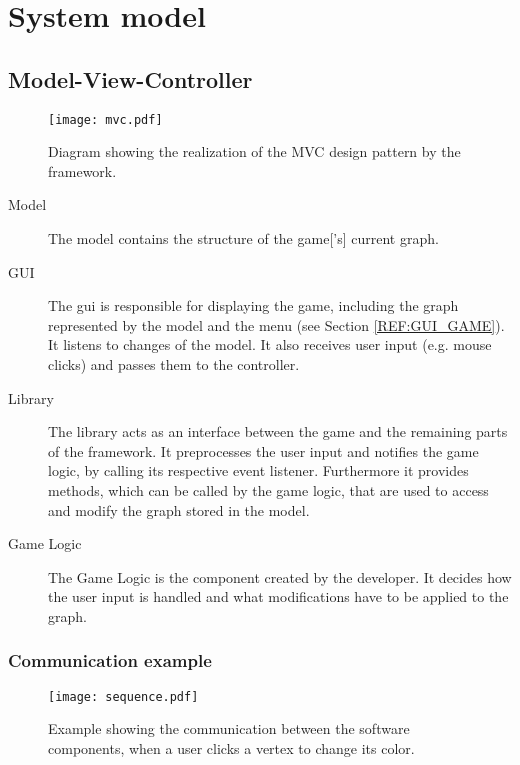 \section{System model}

\subsection{Model-View-Controller}

\begin{figure}[h]
	\centering
	\texttt{[image: mvc.pdf]}
	\caption{Diagram showing the realization of the \gls{MVC} design pattern by the framework.}
	\label{img:MVC}
\end{figure}

\begin{description}
	\item[Model] The model contains the structure of the \gls{game}['s] current \gls{graph}.
	\item[GUI] The \gls{gui} is responsible for displaying the game, including the \gls{graph} represented by the model and the menu (see Section \ref{REF:GUI_GAME}). It listens to changes of the model. It also receives user input (e.g. mouse clicks) and passes them to the controller.
	\item[Library] The library acts as an interface between the game and the remaining parts of the framework. It preprocesses the user input and notifies the game logic, by calling its respective event listener. Furthermore it provides methods, which can be called by the game logic, that are used to access and modify the \gls{graph} stored in the model.
	\item[Game Logic] The Game Logic is the component created by the \gls{developer}. It decides how the user input is handled and what modifications have to be applied to the \gls{graph}. 
\end{description}

\pagebreak
\subsubsection{Communication example}
\begin{figure}[h!]
	\centering
	\texttt{[image: sequence.pdf]}
	\caption{Example showing the communication between the software components, when a user clicks a vertex to change its color.}
	\label{img:SEQ}
\end{figure}
